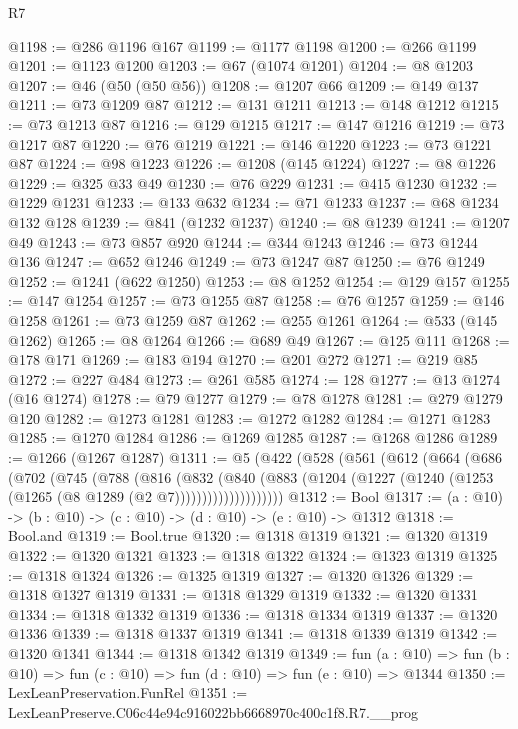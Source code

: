 \begin{lexlean}{R7}
\begin{coremodule}
@1198 := @286 @1196 @167
@1199 := @1177 @1198
@1200 := @266 @1199
@1201 := @1123 @1200
@1203 := @67 (@1074 @1201)
@1204 := @8 @1203
@1207 := @46 (@50 (@50 @56))
@1208 := @1207 @66
@1209 := @149 @137
@1211 := @73 @1209 @87
@1212 := @131 @1211
@1213 := @148 @1212
@1215 := @73 @1213 @87
@1216 := @129 @1215
@1217 := @147 @1216
@1219 := @73 @1217 @87
@1220 := @76 @1219
@1221 := @146 @1220
@1223 := @73 @1221 @87
@1224 := @98 @1223
@1226 := @1208 (@145 @1224)
@1227 := @8 @1226
@1229 := @325 @33 @49
@1230 := @76 @229
@1231 := @415 @1230
@1232 := @1229 @1231
@1233 := @133 @632
@1234 := @71 @1233
@1237 := @68 @1234 @132 @128
@1239 := @841 (@1232 @1237)
@1240 := @8 @1239
@1241 := @1207 @49
@1243 := @73 @857 @920
@1244 := @344 @1243
@1246 := @73 @1244 @136
@1247 := @652 @1246
@1249 := @73 @1247 @87
@1250 := @76 @1249
@1252 := @1241 (@622 @1250)
@1253 := @8 @1252
@1254 := @129 @157
@1255 := @147 @1254
@1257 := @73 @1255 @87
@1258 := @76 @1257
@1259 := @146 @1258
@1261 := @73 @1259 @87
@1262 := @255 @1261
@1264 := @533 (@145 @1262)
@1265 := @8 @1264
@1266 := @689 @49
@1267 := @125 @111
@1268 := @178 @171
@1269 := @183 @194
@1270 := @201 @272
@1271 := @219 @85
@1272 := @227 @484
@1273 := @261 @585
@1274 := 128
@1277 := @13 @1274 (@16 @1274)
@1278 := @79 @1277
@1279 := @78 @1278
@1281 := @279 @1279 @120
@1282 := @1273 @1281
@1283 := @1272 @1282
@1284 := @1271 @1283
@1285 := @1270 @1284
@1286 := @1269 @1285
@1287 := @1268 @1286
@1289 := @1266 (@1267 @1287)
@1311 := @5
    (@422
      (@528
        (@561
          (@612
            (@664
              (@686
                (@702
                  (@745
                    (@788
                      (@816
                        (@832
                          (@840
                            (@883
                              (@1204
                                (@1227 (@1240 (@1253 (@1265 (@8 @1289 (@2 @7))))))))))))))))))))
@1312 := Bool
@1317 := (a : @10) -> (b : @10) -> (c : @10) -> (d : @10) -> (e : @10) -> @1312
@1318 := Bool.and
@1319 := Bool.true
@1320 := @1318 @1319
@1321 := @1320 @1319
@1322 := @1320 @1321
@1323 := @1318 @1322
@1324 := @1323 @1319
@1325 := @1318 @1324
@1326 := @1325 @1319
@1327 := @1320 @1326
@1329 := @1318 @1327 @1319
@1331 := @1318 @1329 @1319
@1332 := @1320 @1331
@1334 := @1318 @1332 @1319
@1336 := @1318 @1334 @1319
@1337 := @1320 @1336
@1339 := @1318 @1337 @1319
@1341 := @1318 @1339 @1319
@1342 := @1320 @1341
@1344 := @1318 @1342 @1319
@1349 := fun (a : @10) => fun (b : @10) => fun (c : @10) => fun (d : @10) => fun (e : @10) => @1344
@1350 := LexLeanPreservation.FunRel
@1351 := LexLeanPreserve.C06c44e94c916022bb6668970c400c1f8.R7.__prog

\end{coremodule}
\end{lexlean}
